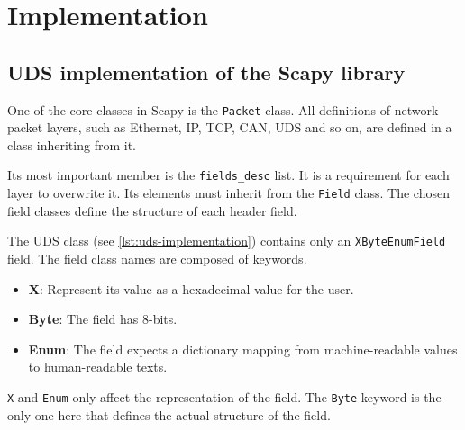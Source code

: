 \chapter{Implementation}

\section{UDS implementation of the Scapy library}

One of the core classes in Scapy is the \texttt{Packet} class. All definitions of network packet layers, such as Ethernet, IP, TCP, CAN, UDS and so on, are defined in a class inheriting from it.

Its most important member is the \texttt{fields_desc} list. It is a requirement for each layer to overwrite it. Its elements must inherit from the \texttt{Field} class. The chosen field classes define the structure of each header field.


The UDS class (see \autoref{lst:uds-implementation}) contains only an \texttt{XByteEnumField} field. The field class names are composed of keywords.
\begin{itemize}
    \item \textbf{X}: Represent its value as a hexadecimal value for the user.
    \item \textbf{Byte}: The field has 8-bits.
    \item \textbf{Enum}: The field expects a dictionary mapping from machine-readable values to human-readable texts.
\end{itemize}

\texttt{X} and \texttt{Enum} only affect the representation of the field. The \texttt{Byte} keyword is the only one here that defines the actual structure of the field.

